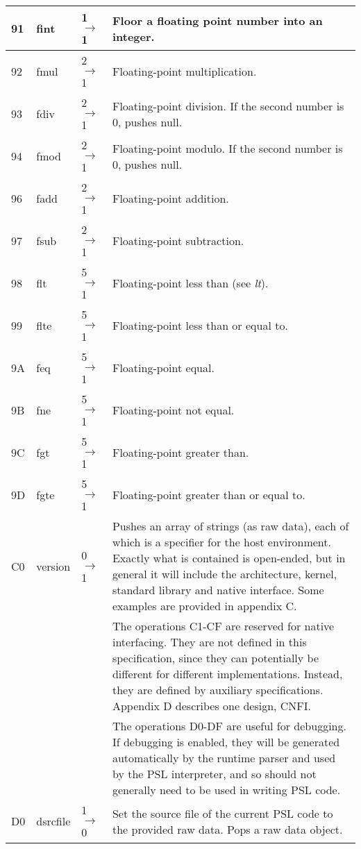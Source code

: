 \begin{longtable}{ | l | l | l | X | }
\hline
91 & fint & 1 $\rightarrow$ 1 & Floor a floating point number into an integer. \\
\hline
92 & fmul & 2 $\rightarrow$ 1 & Floating-point multiplication. \\
\hline
93 & fdiv & 2 $\rightarrow$ 1 & Floating-point division. If the second number is 0, pushes null. \\
\hline
94 & fmod & 2 $\rightarrow$ 1 & Floating-point modulo. If the second number is 0, pushes null. \\
\hline
96 & fadd & 2 $\rightarrow$ 1 & Floating-point addition. \\
\hline
97 & fsub & 2 $\rightarrow$ 1 & Floating-point subtraction. \\
\hline
98 & flt & 5 $\rightarrow$ 1 & Floating-point less than (see \textit{lt}). \\
\hline
99 & flte & 5 $\rightarrow$ 1 & Floating-point less than or equal to. \\
\hline
9A & feq & 5 $\rightarrow$ 1 & Floating-point equal. \\
\hline
9B & fne & 5 $\rightarrow$ 1 & Floating-point not equal. \\
\hline
9C & fgt & 5 $\rightarrow$ 1 & Floating-point greater than. \\
\hline
9D & fgte & 5 $\rightarrow$ 1 & Floating-point greater than or equal to. \\
\hline
C0 & version & 0 $\rightarrow$ 1 & Pushes an array of strings (as raw data), each of which is a specifier for the host environment. Exactly what is contained is open-ended, but in general it will include the architecture, kernel, standard library and native interface. Some examples are provided in appendix C. \\
\hline
  &   &   & The operations C1-CF are reserved for native interfacing. They are not defined in this specification, since they can potentially be different for different implementations. Instead, they are defined by auxiliary specifications. Appendix D describes one design, CNFI. \\
\hline
  &   &   & The operations D0-DF are useful for debugging. If debugging is enabled, they will be generated automatically by the runtime parser and used by the PSL interpreter, and so should not generally need to be used in writing PSL code. \\
\hline
D0 & dsrcfile & 1 $\rightarrow$ 0 & Set the source file of the current PSL code to the provided raw data. Pops a raw data object. \\

\end{longtable}
